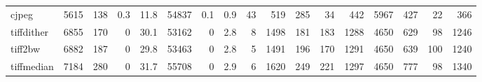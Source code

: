 \begin{tabular}{lrrrrrrrrrrrrrrrr}
 cjpeg           &     5615 &  138 &    0.3 &     11.8 &   54837 &    0.1 &      0.9 &    43 &     519 &  285 &    34 &   442 &  5967 &   427 &     22 &       366 \\
 tiffdither      &     6855 &  170 &    0   &     30.1 &   53162 &    0   &      2.8 &     8 &    1498 &  181 &   183 &  1288 &  4650 &   629 &     98 &      1246 \\
 tiff2bw         &     6882 &  187 &    0   &     29.8 &   53463 &    0   &      2.8 &     5 &    1491 &  196 &   170 &  1291 &  4650 &   639 &    100 &      1240 \\
 tiffmedian      &     7184 &  280 &    0   &     31.7 &   55708 &    0   &      2.9 &     6 &    1620 &  249 &   221 &  1297 &  4650 &   777 &     98 &      1340 \\
\hline
\end{tabular}